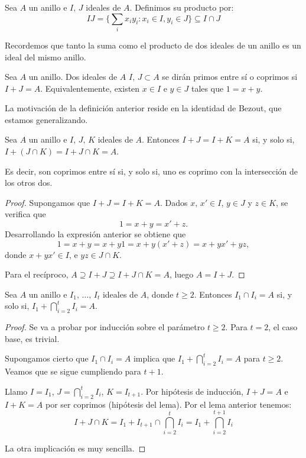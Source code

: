 \begin{df}
  Sea \(A\) un anillo e \(I,\,J\) ideales de \(A\). Definimos su producto por:
  \[
    IJ=\{\sum_i x_i y_i: x_i\in I, y_i\in J\}\subseteq I\cap J
  \]
\end{df}


\noindent Recordemos que tanto la suma como el producto de dos ideales de un anillo es un ideal del mismo anillo.

\begin{df}
  Sea \(A\) un anillo. Dos ideales de \(A\) \(I,\,J\subset A\) se dirán primos entre sí
  o coprimos si \(I+J=A\). Equivalentemente, existen \(x\in I\) e \(y\in J\) tales que
  \(1=x+y\).
\end{df}

\noindent La motivación de la definición anterior reside en la identidad
de Bezout, que estamos generalizando.

\begin{lema}
  Sea \(A\) un anillo e \(I,\,J,\,K\) ideales de \(A\).
  Entonces \(I+J=I+K=A\) si, y solo si, \(I+(J\cap K)=I+J\cap K=A\).

  Es decir, son coprimos entre sí si, y solo si, uno es coprimo
  con la intersección de los otros dos.
\end{lema}
\begin{proof}
  Supongamos que \(I+J=I+K=A\). Dados \(x,\,x'\in I\), \(y\in J\) y \(z\in K\),
  se verifica que \[1=x+y=x'+z.\] Desarrollando la expresión anterior se obtiene que
  \[1=x+y=x+y1=x+y(x'+z)=x+yx'+yz,\]
  donde \(x+yx'\in I\), e \(yz\in J\cap K\).

  Para el recíproco, \(A\supseteq I+J\supseteq I+J\cap K=A\),
  luego \(A=I+J\).
\end{proof}

\begin{lema}
  Sea \(A\) un anillo e \(I_1,\,\ldots,\,I_t\) ideales de \(A\), donde
  \(t \ge 2\).
  Entonces \(I_1\cap I_i=A\) si, y solo si, \(I_1+\bigcap_{i=2}^t I_i=A\).
\end{lema}
\begin{proof}
  Se va a probar por inducción sobre el parámetro \(t \ge 2\).
  Para \(t=2\), el caso base, es trivial.

  Supongamos cierto que \(I_1\cap I_i=A\) implica que
  \(I_1+\bigcap_{i=2}^t I_i=A\) para \(t \ge 2\). Veamos que se sigue cumpliendo
  para \(t+1\).

  Llamo \(I=I_1\), \(J=\bigcap_{i=2}^t I_i\), \(K=I_{t+1}\).
  Por hipótesis de inducción, \(I+J=A\) e \(I+K=A\) por ser coprimos
  (hipótesis del lema). Por el lema anterior tenemos:
  \[
    I+J\cap K=I_1+I_{t+1}\cap \bigcap_{i=2}^{t}
    I_i =I_1 + \bigcap_{i=2}^{t+1} I_i
  \]

  La otra implicación es muy sencilla.
\end{proof}

